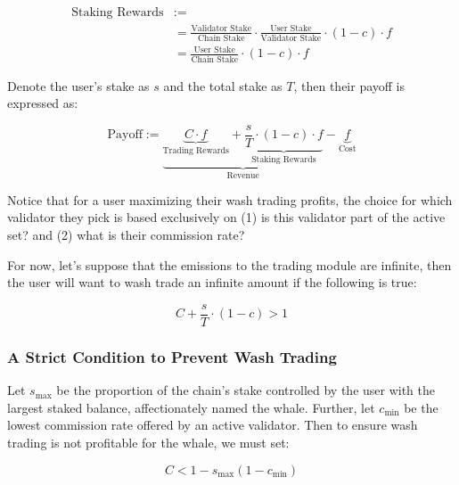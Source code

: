         \begin{align*}
            \text{Staking Rewards} &:= \\ &= \tfrac{\text{Validator Stake}}{\text{Chain Stake}} \cdot \tfrac{\text{User Stake}}{\text{Validator Stake}} \cdot (1 - c) \cdot f  \\ &=\tfrac{\text{User Stake}}{\text{Chain Stake}} \cdot (1 - c) \cdot f
        \end{align*}
        
        Denote the user’s stake as $s$ and the total stake as $T$, then their payoff is expressed as:
        
        \begin{equation}
            \text{Payoff} := \underbrace{\underbrace{C \cdot f}_{\text{Trading Rewards}} + \underbrace{\frac{s}{T} \cdot (1-c) \cdot f}_{\text{Staking Rewards}}}_{\text{Revenue}} - \underbrace{f}_{\text{Cost}}
        \end{equation}
        
        Notice that for a user maximizing their wash trading profits, the choice for which validator they pick is based exclusively on (1) is this validator part of the active set? and (2) what is their commission rate?
        
        For now, let’s suppose that the emissions to the trading module are infinite, then the user will want to wash trade an infinite amount if the following is true:

        \begin{equation}
            C + \frac{s}{T} \cdot (1 - c) > 1
        \end{equation}

        \subsubsection{A Strict Condition to Prevent Wash Trading}

            Let $s_{\text{max}}$ be the proportion of the chain’s stake controlled by the user with the largest staked balance, affectionately named the whale. Further, let $c_{\text{min}}$ be the lowest commission rate offered by an active validator. Then to ensure wash trading is not profitable for the whale, we must set:

            \begin{equation}
                C<1-s_{\text{max}}(1-c_{\text{min}})
            \end{equation}
            
